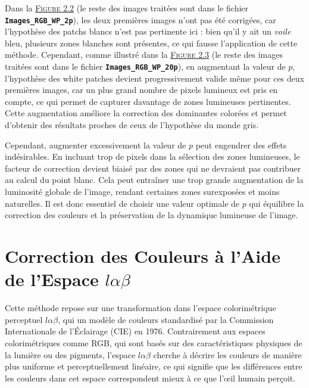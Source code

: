 \documentclass[10pt, a4paper]{extarticle}
\numberwithin{equation}{section}
\numberwithin{figure}{section}
\begin{document}
 \par Dans la \hyperref[figure2.2]{\textsc{Figure} 2.2} (le reste des images traitées sont dans le fichier \colorbox{gray!15}{\texttt{\textbf{Images\_RGB\_WP\_2p}}}), les deux premières images n'ont pas été corrigées, car l'hypothèse des patchs blancs n'est pas pertinente ici : bien qu'il y ait un \textit{voile} bleu, plusieurs zones blanches sont présentes, ce qui fausse l'application de cette méthode. Cependant, comme illustré dans la \hyperref[figure2.2]{\textsc{Figure} 2.3} (le reste des images traitées sont dans le fichier \colorbox{gray!15}{\texttt{\textbf{Images\_RGB\_WP\_20p}}}), en augmentant la valeur de \( p \), l'hypothèse des white patches devient progressivement valide même pour ces deux premières images, car un plus grand nombre de pixels lumineux est pris en compte, ce qui permet de capturer davantage de zones lumineuses pertinentes. Cette augmentation améliore la correction des dominantes colorées et permet d'obtenir des résultats proches de ceux de l'hypothèse du monde gris.
\vspace{3mm}
\par Cependant, augmenter excessivement la valeur de \( p \) peut engendrer des effets indésirables. En incluant trop de pixels dans la sélection des zones lumineuses, le facteur de correction devient biaisé par des zones qui ne devraient pas contribuer au calcul du point blanc. Cela peut entraîner une trop grande augmentation de la luminosité globale de l'image, rendant certaines zones surexposées et moins naturelles. Il est donc essentiel de choisir une valeur optimale de \( p \) qui équilibre la correction des couleurs et la préservation de la dynamique lumineuse de l'image.

\section{Correction des Couleurs à l'Aide de l'Espace $l\alpha\beta$}

\par Cette méthode repose sur une transformation dans l'espace colorimétrique perceptuel $l\alpha\beta$, qui un modèle de couleurs standardisé par la Commission Internationale de l'Éclairage (CIE) en 1976. Contrairement aux espaces colorimétriques comme RGB, qui sont basés sur des caractéristiques physiques de la lumière ou des pigments, l'espace $l\alpha\beta$ cherche à décrire les couleurs de manière plus uniforme et perceptuellement linéaire, ce qui signifie que les différences entre les couleurs dans cet espace correspondent mieux à ce que l'œil humain perçoit.
\end{document}
